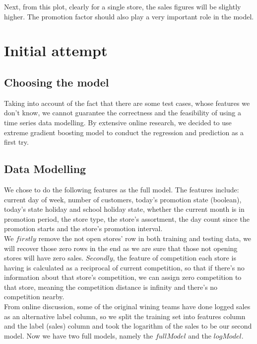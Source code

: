 \documentclass{article}
\begin{document}
Next, from this plot, clearly for a single store, the sales figures will be slightly higher. The promotion factor should also play a very important role in the model.

\newpage

\section{Initial attempt}


\subsection{Choosing the model}
Taking into account of the fact that there are some test cases, whose features we don't know, we cannot guarantee the correctness and the feasibility of using a time series data modelling. By extensive online research, we decided to use extreme gradient boosting model to conduct the regression and prediction as a first try.

\subsection{Data Modelling}
We chose to do the following features as the full model. The features include: current day of week, number of customers, today's promotion state (boolean), today's state holiday and school holiday state, whether the current month is in promotion period, the store type, the store's assortment, the day count since the promotion starts and the store's promotion interval.\\

We $firstly$ remove the not open stores' row in both training and testing data, we will recover those zero rows in the end as we are sure that those not opening stores will have zero sales. $Secondly$, the feature of competition each store is having is calculated as a reciprocal of current competition, so that if there's no information about that store's competition, we can assign zero competition to that store, meaning the competition distance is infinity and there's no competition nearby.\\

From online discussion, some of the original wining teams have done logged sales as an alternative label column, so we split the training set into features column and the label (sales) column and took the logarithm of the sales to be our second model. Now we have two full models, namely the $full Model$ and the $log Model$.\\
\end{document}
